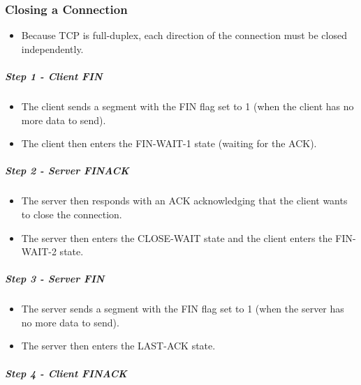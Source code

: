 \documentclass{article}
\begin{document}
\subsubsection{Closing a Connection}

\begin{itemize}
    \item Because TCP is full-duplex, each direction of the connection must be closed independently.
\end{itemize}

\subparagraph{Step 1 - Client FIN}

\begin{itemize}
    \item The client sends a segment with the FIN flag set to 1 (when the client has no more data to send).
    \item The client then enters the FIN-WAIT-1 state (waiting for the ACK).
\end{itemize}

\subparagraph{Step 2 - Server FINACK}

\begin{itemize}
    \item The server then responds with an ACK acknowledging that the client wants to close the connection.
    \item The server then enters the CLOSE-WAIT state and the client enters the FIN-WAIT-2 state.
\end{itemize}

\subparagraph{Step 3 - Server FIN}

\begin{itemize}
    \item The server sends a segment with the FIN flag set to 1 (when the server has no more data to send).
    \item The server then enters the LAST-ACK state.
\end{itemize}

\subparagraph{Step 4 - Client FINACK}
\end{document}
